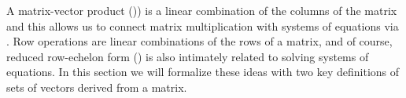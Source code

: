 %
\begin{introduction}
\begin{para}A matrix-vector product ()) is a linear combination of the columns of the matrix and this allows us to connect matrix multiplication with systems of equations via .  Row operations are linear combinations of the rows of a matrix, and of course, reduced row-echelon form () is also intimately related to solving systems of equations.  In this section we will formalize these ideas with two key definitions of sets of vectors derived from a matrix.\end{para}
\end{introduction}
%
